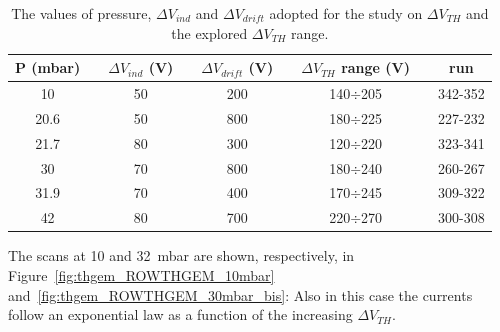 \documentclass[a4paper, 11 pt]{report}
\newcommand{\Vind}{$\Delta V_{ind}$}
\newcommand{\Vthgem}{$\Delta V_{TH}$}
\newcommand{\Vdrift}{$ \Delta V_{drift}$}
\begin{document}
\begin{table} [htbp]
	\begin{center}
		\renewcommand{\arraystretch}{1.2}
		\begin{tabular} {ccccccccc}
			P (mbar) & & \Vind{} (V) & & \Vdrift{} (V) & & \Vthgem{} range (V) & & run\\
			\toprule[0.1em]
			10		& & 50	& & 200	& & 140$\div$205 & & 342-352\\
			20.6	& &	50	& &	800 & & 180$\div$225 & & 227-232\\
			21.7	& & 80	& & 300	& & 120$\div$220 & & 323-341\\
			30		& &	70	& & 800 & & 180$\div$240 & & 260-267\\
			31.9	& & 70	& &	400	& & 170$\div$245 & & 309-322\\
			42		& & 80	& & 700 & & 220$\div$270 & & 300-308\\
			\bottomrule[0.1em]
		\end{tabular}
	\end{center}
	\caption{The values of pressure, \Vind{} and \Vdrift{} adopted for the study on \Vthgem{} and the 
	explored \Vthgem{} range.} \label{tab:ROWTHGEM_vthgem}
\end{table}
The scans at 10 and 32~mbar are shown, respectively, in Figure~\ref{fig:thgem_ROWTHGEM_10mbar} 
and~\ref{fig:thgem_ROWTHGEM_30mbar_bis}: Also in this case the currents follow an exponential law 
as a function of the increasing \Vthgem.
 
\end{document}
